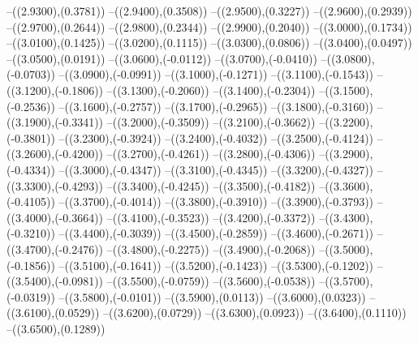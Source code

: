 {	--({\sx*(2.9300)},{\sy*(0.3781)})
	--({\sx*(2.9400)},{\sy*(0.3508)})
	--({\sx*(2.9500)},{\sy*(0.3227)})
	--({\sx*(2.9600)},{\sy*(0.2939)})
	--({\sx*(2.9700)},{\sy*(0.2644)})
	--({\sx*(2.9800)},{\sy*(0.2344)})
	--({\sx*(2.9900)},{\sy*(0.2040)})
	--({\sx*(3.0000)},{\sy*(0.1734)})
	--({\sx*(3.0100)},{\sy*(0.1425)})
	--({\sx*(3.0200)},{\sy*(0.1115)})
	--({\sx*(3.0300)},{\sy*(0.0806)})
	--({\sx*(3.0400)},{\sy*(0.0497)})
	--({\sx*(3.0500)},{\sy*(0.0191)})
	--({\sx*(3.0600)},{\sy*(-0.0112)})
	--({\sx*(3.0700)},{\sy*(-0.0410)})
	--({\sx*(3.0800)},{\sy*(-0.0703)})
	--({\sx*(3.0900)},{\sy*(-0.0991)})
	--({\sx*(3.1000)},{\sy*(-0.1271)})
	--({\sx*(3.1100)},{\sy*(-0.1543)})
	--({\sx*(3.1200)},{\sy*(-0.1806)})
	--({\sx*(3.1300)},{\sy*(-0.2060)})
	--({\sx*(3.1400)},{\sy*(-0.2304)})
	--({\sx*(3.1500)},{\sy*(-0.2536)})
	--({\sx*(3.1600)},{\sy*(-0.2757)})
	--({\sx*(3.1700)},{\sy*(-0.2965)})
	--({\sx*(3.1800)},{\sy*(-0.3160)})
	--({\sx*(3.1900)},{\sy*(-0.3341)})
	--({\sx*(3.2000)},{\sy*(-0.3509)})
	--({\sx*(3.2100)},{\sy*(-0.3662)})
	--({\sx*(3.2200)},{\sy*(-0.3801)})
	--({\sx*(3.2300)},{\sy*(-0.3924)})
	--({\sx*(3.2400)},{\sy*(-0.4032)})
	--({\sx*(3.2500)},{\sy*(-0.4124)})
	--({\sx*(3.2600)},{\sy*(-0.4200)})
	--({\sx*(3.2700)},{\sy*(-0.4261)})
	--({\sx*(3.2800)},{\sy*(-0.4306)})
	--({\sx*(3.2900)},{\sy*(-0.4334)})
	--({\sx*(3.3000)},{\sy*(-0.4347)})
	--({\sx*(3.3100)},{\sy*(-0.4345)})
	--({\sx*(3.3200)},{\sy*(-0.4327)})
	--({\sx*(3.3300)},{\sy*(-0.4293)})
	--({\sx*(3.3400)},{\sy*(-0.4245)})
	--({\sx*(3.3500)},{\sy*(-0.4182)})
	--({\sx*(3.3600)},{\sy*(-0.4105)})
	--({\sx*(3.3700)},{\sy*(-0.4014)})
	--({\sx*(3.3800)},{\sy*(-0.3910)})
	--({\sx*(3.3900)},{\sy*(-0.3793)})
	--({\sx*(3.4000)},{\sy*(-0.3664)})
	--({\sx*(3.4100)},{\sy*(-0.3523)})
	--({\sx*(3.4200)},{\sy*(-0.3372)})
	--({\sx*(3.4300)},{\sy*(-0.3210)})
	--({\sx*(3.4400)},{\sy*(-0.3039)})
	--({\sx*(3.4500)},{\sy*(-0.2859)})
	--({\sx*(3.4600)},{\sy*(-0.2671)})
	--({\sx*(3.4700)},{\sy*(-0.2476)})
	--({\sx*(3.4800)},{\sy*(-0.2275)})
	--({\sx*(3.4900)},{\sy*(-0.2068)})
	--({\sx*(3.5000)},{\sy*(-0.1856)})
	--({\sx*(3.5100)},{\sy*(-0.1641)})
	--({\sx*(3.5200)},{\sy*(-0.1423)})
	--({\sx*(3.5300)},{\sy*(-0.1202)})
	--({\sx*(3.5400)},{\sy*(-0.0981)})
	--({\sx*(3.5500)},{\sy*(-0.0759)})
	--({\sx*(3.5600)},{\sy*(-0.0538)})
	--({\sx*(3.5700)},{\sy*(-0.0319)})
	--({\sx*(3.5800)},{\sy*(-0.0101)})
	--({\sx*(3.5900)},{\sy*(0.0113)})
	--({\sx*(3.6000)},{\sy*(0.0323)})
	--({\sx*(3.6100)},{\sy*(0.0529)})
	--({\sx*(3.6200)},{\sy*(0.0729)})
	--({\sx*(3.6300)},{\sy*(0.0923)})
	--({\sx*(3.6400)},{\sy*(0.1110)})
	--({\sx*(3.6500)},{\sy*(0.1289)})
}
